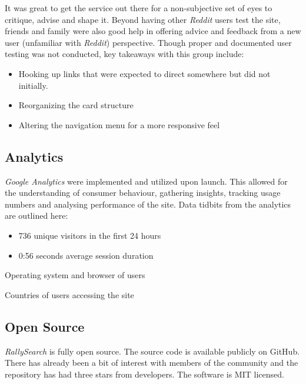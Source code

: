 \documentclass[msc,oneside]{ubcthesis}%
\begin{document}
It was great to get the service out there for a non-subjective set of eyes to critique, advise and shape it. Beyond having other \textit{Reddit} users test the site, friends and family were also good help in offering advice and feedback from a new user (unfamiliar with \textit{Reddit}) perspective. Though proper and documented user testing was not conducted, key takeaways with this group include:
\begin{itemize}
\item{Hooking up links that were expected to direct somewhere but did not initially.}
\item{Reorganizing the card structure}
\item{Altering the navigation menu for a more responsive feel}
\end{itemize}

\subsection{Analytics}
\textit{Google Analytics} were implemented and utilized upon launch. This allowed for the understanding of consumer behaviour, gathering insights, tracking usage numbers and analysing performance of the site. Data tidbits from the analytics are outlined here:
\begin{itemize}
\item{736 unique visitors in the first 24 hours}
\item{0:56 seconds average session duration}
\end{itemize}
\begin{table}[H]
\begin{center}
\caption{Operating system and browser of users}\label{tab:osandbrowser}
\end{center}
\end{table}

\begin{table}[H]
\begin{center}
\caption{Countries of users accessing the site}\label{tab:country}
\end{center}
\end{table}

\subsection{Open Source}
\textit{RallySearch} is fully open source. The source code is available publicly on GitHub. There has already been a bit of interest with members of the community and the repository has had three stars from developers. The software is MIT licensed. 
\end{document}

